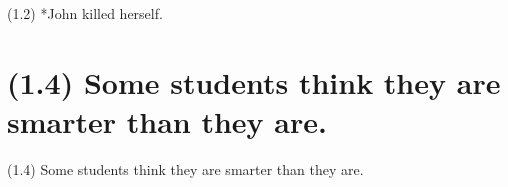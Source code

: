\documentclass{article}
\begin{document}
\bigbreak
\begin{enumerate*}
\item[(1.2)] *John killed herself.
\end{enumerate*}
\bigbreak

\bigbreak
\begin{minipage}{\textwidth}
\end{minipage}
\bigbreak

\clearpage

%
%

\section*{(1.4) Some students think they are smarter than they are.}

\bigbreak
\begin{enumerate*}
\item[(1.4)] Some students think they are smarter than they are.
\end{enumerate*}
\bigbreak

\bigbreak
\begin{minipage}{\textwidth}
\end{minipage}
\bigbreak

\clearpage

%
%
\end{document}
